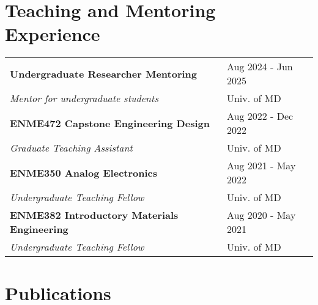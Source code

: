 \documentclass[letterpaper, 11pt]{article}
\begin{document}
\section{Teaching and Mentoring Experience}
\begin{table}[H]
    \centering
    \begin{tabular}{L{0.7\textwidth} R{0.2\textwidth}}
    	\textbf{Undergraduate Researcher Mentoring} & Aug 2024 - Jun 2025 \\
    	\hspace{5pt} \textit{Mentor for undergraduate students} & Univ. of MD \\

        \textbf{ENME472 Capstone Engineering Design} & Aug 2022 - Dec 2022 \\
        \hspace{5pt} \textit{Graduate Teaching Assistant} &  Univ. of MD\\

        \textbf{ENME350 Analog Electronics} & Aug 2021 - May 2022 \\
        \hspace{5pt} \textit{Undergraduate Teaching Fellow} & Univ. of MD\\


        \textbf{ENME382 Introductory Materials Engineering} & Aug 2020 - May 2021 \\
        \hspace{5pt} \textit{Undergraduate Teaching Fellow} & Univ. of MD\\

    \end{tabular}
\end{table}

\section{Publications}
\end{document}
